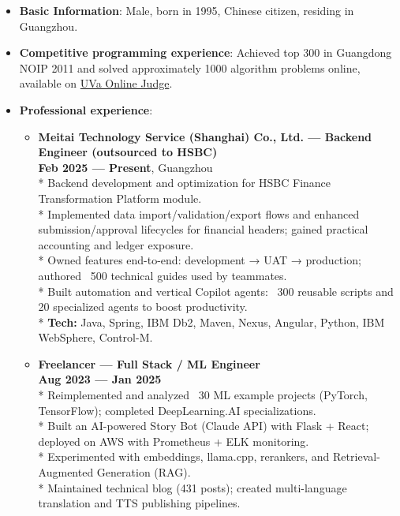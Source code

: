 \documentclass[11pt, a4paper]{latex/awesome-cv}
\begin{document}
\Large
\begin{itemize}
    \item \textbf{Basic Information}: Male, born in 1995, Chinese citizen, residing in Guangzhou.
    \item \textbf{Competitive programming experience}: Achieved top 300 in Guangdong NOIP 2011 and solved approximately 1000 algorithm problems online, available on \href{https://uhunt.onlinejudge.org/id/113519}{UVa Online Judge}.
    \item \textbf{Professional experience}:
        \begin{itemize}
            \item \textbf{Meitai Technology Service (Shanghai) Co., Ltd. — Backend Engineer (outsourced to HSBC)} \\
            \textbf{Feb 2025 — Present}, Guangzhou \\
            * Backend development and optimization for HSBC Finance Transformation Platform module. \\
            * Implemented data import/validation/export flows and enhanced submission/approval lifecycles for financial headers; gained practical accounting and ledger exposure. \\
            * Owned features end-to-end: development → UAT → production; authored ~500 technical guides used by teammates. \\
            * Built automation and vertical Copilot agents: ~300 reusable scripts and 20 specialized agents to boost productivity. \\
            * \textbf{Tech:} Java, Spring, IBM Db2, Maven, Nexus, Angular, Python, IBM WebSphere, Control-M.

            \item \textbf{Freelancer — Full Stack / ML Engineer} \\
            \textbf{Aug 2023 — Jan 2025} \\
            * Reimplemented and analyzed ~30 ML example projects (PyTorch, TensorFlow); completed DeepLearning.AI specializations. \\
            * Built an AI-powered Story Bot (Claude API) with Flask + React; deployed on AWS with Prometheus + ELK monitoring. \\
            * Experimented with embeddings, llama.cpp, rerankers, and Retrieval-Augmented Generation (RAG). \\
            * Maintained technical blog (431 posts); created multi-language translation and TTS publishing pipelines.


\end{itemize}
\end{itemize}
\end{document}
